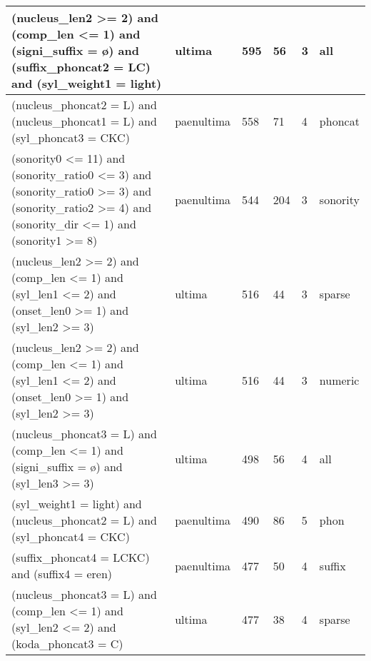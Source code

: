 \begin{table}
\begin{tabular}{|p{8cm}l|ll|ll|}
(nucleus\_len2 \textgreater= 2) and (comp\_len \textless= 1) and (signi\_suffix = ø) and (suffix\_phoncat2 = LC) and (syl\_weight1 = light)                                                                  & ultima     & 595  & 56  & 3 & all       \\\hline
(nucleus\_phoncat2 = L) and (nucleus\_phoncat1 = L) and (syl\_phoncat3 = CKC)                                                                                                                                & paenultima & 558  & 71  & 4 & phoncat   \\\hline
(sonority0 \textless= 11) and (sonority\_ratio0 \textless= 3) and (sonority\_ratio0 \textgreater= 3) and (sonority\_ratio2 \textgreater= 4) and (sonority\_dir \textless= 1) and (sonority1 \textgreater= 8) & paenultima & 544  & 204 & 3 & sonority  \\\hline
(nucleus\_len2 \textgreater= 2) and (comp\_len \textless= 1) and (syl\_len1 \textless= 2) and (onset\_len0 \textgreater= 1) and (syl\_len2 \textgreater= 3)                                                  & ultima     & 516  & 44  & 3 & sparse    \\\hline
(nucleus\_len2 \textgreater= 2) and (comp\_len \textless= 1) and (syl\_len1 \textless= 2) and (onset\_len0 \textgreater= 1) and (syl\_len2 \textgreater= 3)                                                  & ultima     & 516  & 44  & 3 & numeric   \\\hline
(nucleus\_phoncat3 = L) and (comp\_len \textless= 1) and (signi\_suffix = ø) and (syl\_len3 \textgreater= 3)                                                                                                 & ultima     & 498  & 56  & 4 & all       \\\hline
(syl\_weight1 = light) and (nucleus\_phoncat2 = L) and (syl\_phoncat4 = CKC)                                                                                                                                 & paenultima & 490  & 86  & 5 & phon     \\\hline
(suffix\_phoncat4 = LCKC) and (suffix4 = eren)                                                                                                                                                                                                              & paenultima     & 477 & 50  & 4 & suffix    \\\hline
(nucleus\_phoncat3 = L) and (comp\_len \textless= 1) and (syl\_len2 \textless= 2) and (koda\_phoncat3 = C)                                                                                                                                                  & ultima         & 477 & 38  & 4 & sparse    \\\hline

\end{tabular}
\end{table}
